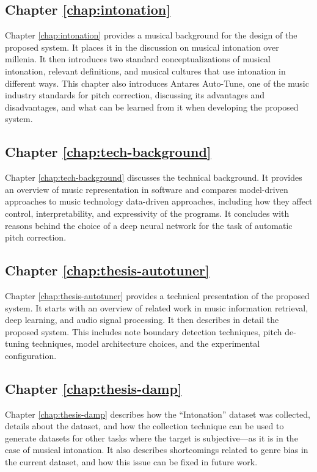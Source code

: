 \subsection{Chapter \ref{chap:intonation}}
Chapter \ref{chap:intonation} provides a musical background for the design of the proposed system. It places it in the discussion on musical intonation over millenia. It then introduces two standard conceptualizations of musical intonation, relevant definitions, and musical cultures that use intonation in different ways. This chapter also introduces Antares Auto-Tune, one of the music industry standards for pitch correction, discussing its advantages and disadvantages, and what can be learned from it when developing the proposed system.

\subsection{Chapter \ref{chap:tech-background}}
Chapter \ref{chap:tech-background} discusses the technical background. It provides an overview of music representation in software and compares model-driven approaches to music technology data-driven approaches, including how they affect control, interpretability, and expressivity of the programs. It concludes with reasons behind the choice of a deep neural network for the task of automatic pitch correction.

\subsection{Chapter \ref{chap:thesis-autotuner}}
Chapter \ref{chap:thesis-autotuner} provides a technical presentation of the proposed system. It starts with an overview of related work in music information retrieval, deep learning, and audio signal processing. It then describes in detail the proposed system. This includes note boundary detection techniques, pitch de-tuning techniques, model architecture choices, and the experimental configuration.

\subsection{Chapter \ref{chap:thesis-damp}}
Chapter \ref{chap:thesis-damp} describes how the ``Intonation'' dataset was collected, details about the dataset, and how the collection technique can be used to generate datasets for other tasks where the target is subjective---as it is in the case of musical intonation. It also describes shortcomings related to genre bias in the current dataset, and how this issue can be fixed in future work.

